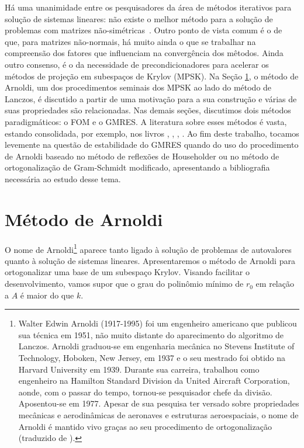 
Há uma unanimidade entre os pesquisadores da área de métodos iterativos para solução de sistemas lineares: não existe o melhor método para a solução de problemas com matrizes não-simétricas~\cite{NachtigalReddyEtAl1992How}. Outro ponto de vista comum é o de que, para matrizes não-normais, há muito ainda o  que se trabalhar na compreensão dos fatores que influenciam na convergência dos mêtodos. Ainda outro consenso, é o da necessidade de precondicionadores para acelerar os métodos de projeção em subespaços de Krylov (MPSK). Na Seção \ref{arnol_sec_arnol}, o método de Arnoldi,  um dos procedimentos seminais dos MPSK ao lado do método de Lanczos, é discutido a partir de uma motivação para a sua construção e várias de suas propriedades são relacionadas. Nas demais seções, discutimos dois métodos paradigmáticos: o FOM e o GMRES. A literatura sobre esses métodos é vasta, estando consolidada, por exemplo, nos livros \cite{Brezinski2002Outils}, \cite{Greenbaum97Iterative}, \cite{Saad03Iterative},  \cite{Vorst03Iterative}.  Ao fim deste trabalho, tocamos levemente na questão de estabilidade do GMRES quando do uso  do procedimento de Arnoldi baseado no método de reflexões de Householder ou no método de ortogonalização de Gram-Schmidt modificado,  apresentando a bibliografia necessária ao estudo desse tema. 

\section{Método de Arnoldi}\label{arnol_sec_arnol}
O nome de Arnoldi\footnote{Walter Edwin Arnoldi (1917-1995) foi um engenheiro americano que publicou sua técnica em 1951, não muito distante do aparecimento do algoritmo de Lanczos. Arnoldi graduou-se em engenharia mecânica no Stevens Institute of Technology, Hoboken, New
Jersey, em 1937 e o seu mestrado foi obtido na Harvard University em 1939. Durante sua carreira, trabalhou como engenheiro na Hamilton Standard Division da United Aircraft Corporation, aonde, com o passar do tempo, tornou-se pesquisador chefe da divisão. Aposentou-se em 1977. Apesar de sua pesquisa ter versado sobre propriedades mecânicas e aerodinâmicas de aeronaves e estruturas aeroespaciais, o nome de Arnoldi é mantido vivo graças ao seu procedimento de ortogonalização (traduzido de \cite{Meyer00Matrix}).} aparece tanto ligado à solução de problemas de autovalores quanto à solução de sistemas lineares.  Apresentaremos o método de Arnoldi \cite{Arnoldi51principle} para ortogonalizar uma base de um subespaço Krylov.
 Visando facilitar o desenvolvimento, vamos supor que o grau do polinômio mínimo  de $r_0$ em relação a $A$ é maior do que $k$.

